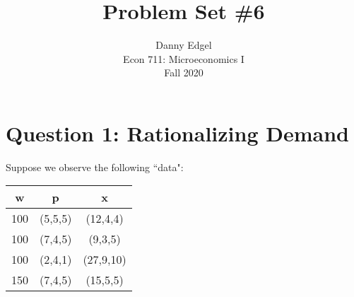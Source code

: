 \documentclass{article}
\begin{document}
\title{	Problem Set \#6 }
\author{ 	Danny Edgel 					\\ 
			Econ 711: Microeconomics I		\\
			Fall 2020						\\
		}
\maketitle\thispagestyle{empty}



\section*{Question 1: Rationalizing Demand}
Suppose we observe the following ``data":
\begin{center}
	\begin{tabular}{c c c}
		w 		& p 		& x 		\\ \hline 
		100		& (5,5,5)	& (12,4,4) 	\\
		100		& (7,4,5)	& (9,3,5) 	\\
		100		& (2,4,1)	& (27,9,10) \\
		150		& (7,4,5)	& (15,5,5)
	\end{tabular} 
\end{center}
\end{document}

